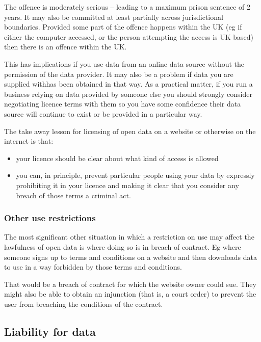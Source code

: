 The offence is moderately serious -- leading to a maximum prison
sentence of 2 years. It may also be committed at least partially across
jurisdictional boundaries. Provided some part of the offence happens
within the UK (eg if either the computer accessed, or the person
attempting the access is UK based) then there is an offence within the
UK.

This has implications if you use data from an online data source without
the permission of the data provider. It may also be a problem if data
you are supplied withhas been obtained in that way. As a practical
matter, if you run a business relying on data provided by someone else
you should strongly consider negotiating licence terms with them so you
have some confidence their data source will continue to exist or be
provided in a particular way.

The take away lesson for licensing of open data on a website or
otherwise on the internet is that:

\begin{itemize}
\item
  your licence should be clear about what kind of access is allowed
\item
  you can, in principle, prevent particular people using your data by
  expressly prohibiting it in your licence and making it clear that you
  consider any breach of those terms a criminal act.
\end{itemize}

\subsubsection{Other use restrictions}\label{other-use-restrictions}

The most significant other situation in which a restriction on use may
affect the lawfulness of open data is where doing so is in breach of
contract. Eg where someone signs up to terms and conditions on a website
and then downloads data to use in a way forbidden by those terms and
conditions.

That would be a breach of contract for which the website owner could
sue. They might also be able to obtain an injunction (that is, a court
order) to prevent the user from breaching the conditions of the
contract.

\subsection{Liability for data}\label{liability-for-data}

